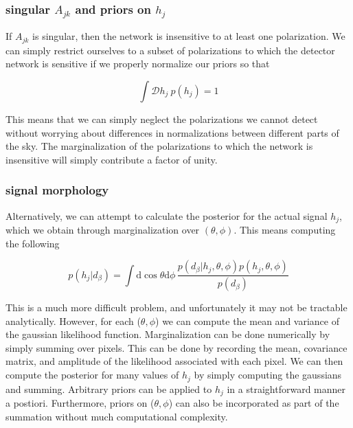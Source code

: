 \documentclass[10pt]{article}
\begin{document}
\subsubsection{singular $A_{jk}$ and priors on $h_j$}

If $A_{jk}$ is singular, then the network is insensitive to at least one polarization. We can simply restrict ourselves to a subset of polarizations to which the detector network is sensitive if we properly normalize our priors so that

\begin{equation}
\int\mathcal{D}h_j\ p(h_j) = 1
\end{equation}

This means that we can simply neglect the polarizations we cannot detect without worrying about differences in normalizations between different parts of the sky. The marginalization of the polarizations to which the network is insensitive will simply contribute a factor of unity.


\subsubsection{signal morphology}

Alternatively, we can attempt to calculate the posterior for the actual signal $h_j$, which we obtain through marginalization over $(\theta, \phi)$. This means computing the following

\begin{equation}
p(h_j|d_\beta) = \int\mathrm{d}\cos\theta\mathrm{d}\phi\, \frac{p(d_\beta|h_j, \theta, \phi)p(h_j, \theta, \phi)}{p(d_\beta)}
\end{equation}

This is a much more difficult problem, and unfortunately it may not be tractable analytically. However, for each ($\theta,\phi$) we can compute the mean and variance of the gaussian likelihood function. Marginalization can be done numerically by simply summing over pixels. This can be done by recording the mean, covariance matrix, and amplitude of the likelihood associated with each pixel. We can then compute the posterior for many values of $h_j$ by simply computing the gaussians and summing. Arbitrary priors can be applied to $h_j$ in a straightforward manner a postiori. Furthermore, priors on ($\theta,\phi$) can also be incorporated as part of the summation without much computational complexity.
\end{document}
